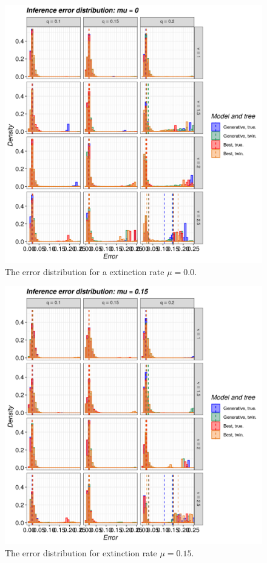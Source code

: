 \begin{figure}[!htbp]
  \includegraphics[width=\textwidth]{20190905_figure_1a.png}
  \caption{
    The error distribution for a extinction rate $\mu = 0.0$.
  }
  \label{fig:errors_yule}
\end{figure}

\begin{figure}[!htbp]
  \includegraphics[width=\textwidth]{20190905_figure_1b.png}
  \caption{
    The error distribution for extinction rate $\mu = 0.15$.
  }
  \label{fig:errors_bd}
\end{figure}
